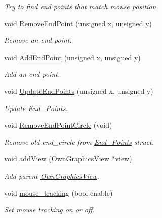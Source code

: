 \begin{DoxyCompactItemize}
\begin{DoxyCompactList}\small\item\em Try to find end points that match mouse position. \end{DoxyCompactList}\item 
void \mbox{\hyperlink{classOwnGraphicsScene_a4f029a37e96fc022295ce4e421319ddf}{Remove\+End\+Point}} (unsigned x, unsigned y)
\begin{DoxyCompactList}\small\item\em Remove an end point. \end{DoxyCompactList}\item 
void \mbox{\hyperlink{classOwnGraphicsScene_a64ce3afc4e535576fedbfe3f172cea0d}{Add\+End\+Point}} (unsigned x, unsigned y)
\begin{DoxyCompactList}\small\item\em Add an end point. \end{DoxyCompactList}\item 
void \mbox{\hyperlink{classOwnGraphicsScene_adf8d1495517483ba65c1ccbc95920a1c}{Update\+End\+Points}} (unsigned x, unsigned y)
\begin{DoxyCompactList}\small\item\em Update \mbox{\hyperlink{structEnd__Points}{End\+\_\+\+Points}}. \end{DoxyCompactList}\item 
void \mbox{\hyperlink{classOwnGraphicsScene_a4b1ba1b97b89baad08c3ba5471ebb61f}{Remove\+End\+Point\+Circle}} (void)
\begin{DoxyCompactList}\small\item\em Remove old end\+\_\+circle from \mbox{\hyperlink{structEnd__Points}{End\+\_\+\+Points}} struct. \end{DoxyCompactList}\item 
void \mbox{\hyperlink{classOwnGraphicsScene_a8677d9cbb1f01943c303be0985c84fbe}{add\+View}} (\mbox{\hyperlink{classOwnGraphicsView}{Own\+Graphics\+View}} $\ast$view)
\begin{DoxyCompactList}\small\item\em Add parent \mbox{\hyperlink{classOwnGraphicsView}{Own\+Graphics\+View}}. \end{DoxyCompactList}\item 
void \mbox{\hyperlink{classOwnGraphicsScene_adbcfda0bade866b7e5db29b7bfb53e0c}{mouse\+\_\+tracking}} (bool enable)
\begin{DoxyCompactList}\small\item\em Set mouse tracking on or off. \end{DoxyCompactList}\item 

\end{DoxyCompactItemize}
